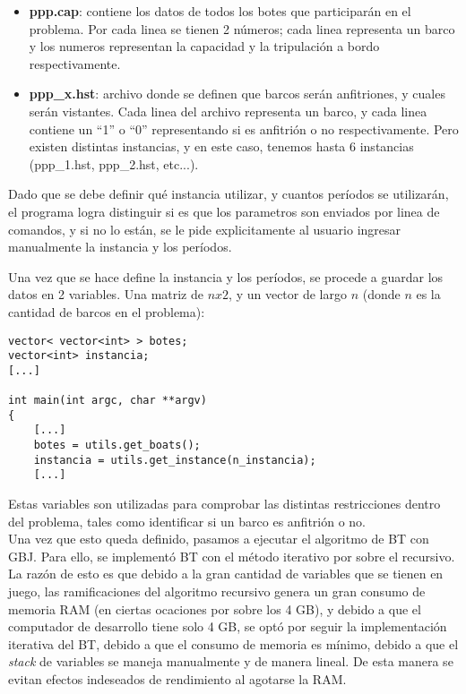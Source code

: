 \documentclass[letter, 10pt]{article}
\begin{document}
\begin{itemize}
\item \textbf{ppp.cap}: contiene los datos de todos los botes que participarán en el problema. Por cada linea se tienen 2 números; cada linea representa un barco y los numeros representan la capacidad y la tripulación a bordo respectivamente.

\item \textbf{ppp\_x.hst}: archivo donde se definen que barcos serán anfitriones, y cuales serán vistantes. Cada linea del archivo representa un barco, y cada linea contiene un ``1'' o ``0'' representando si es anfitrión o no respectivamente. Pero existen distintas instancias, y en este caso, tenemos hasta 6 instancias (ppp\_1.hst, ppp\_2.hst, etc...).
\end{itemize}

Dado que se debe definir qué instancia utilizar, y cuantos períodos se utilizarán, el programa logra distinguir si es que los parametros son enviados por linea de comandos, y si no lo están, se le pide explicitamente al usuario ingresar manualmente la instancia y los períodos.

Una vez que se hace define la instancia y los períodos, se procede a guardar los datos en 2 variables. Una matriz de $nx2$, y un vector de largo $n$ (donde $n$ es la cantidad de barcos en el problema):

\begin{verbatim}
vector< vector<int> > botes;
vector<int> instancia;
[...]

int main(int argc, char **argv)
{
    [...]
    botes = utils.get_boats();
    instancia = utils.get_instance(n_instancia);
    [...]
\end{verbatim}

Estas variables son utilizadas para comprobar las distintas restricciones dentro del problema, tales como identificar si un barco es anfitrión o no.\\

Una vez que esto queda definido, pasamos a ejecutar el algoritmo de BT con GBJ. Para ello, se implementó BT con el método iterativo por sobre el recursivo. La razón de esto es que debido a la gran cantidad de variables que se tienen en juego, las ramificaciones del algoritmo recursivo genera un gran consumo de memoria RAM (en ciertas ocaciones por sobre los 4 GB), y debido a que el computador de desarrollo tiene solo 4 GB, se optó por seguir la implementación iterativa del BT, debido a que el consumo de memoria es mínimo, debido a que el \textit{stack} de variables se maneja manualmente y de manera lineal. De esta manera se evitan efectos indeseados de rendimiento al agotarse la RAM.\\
\end{document}
